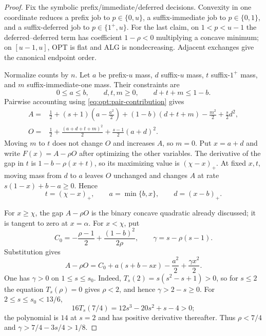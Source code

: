 \begin{proof}
Fix the symbolic prefix/immediate/deferred decisions.  Convexity in one
coordinate reduces a prefix job to $p\in\{0,u\}$, a suffix-immediate job to
$p\in\{0,1\}$, and a suffix-deferred job to $p\in\{1^+,u\}$.  For the last
claim, on $1<p<u-1$ the deferred--deferred term has coefficient
$1-\rho<0$ multiplying a concave minimum; on $[u-1,u]$, OPT is flat and ALG
is nondecreasing.  Adjacent exchanges give the canonical endpoint order.

Normalize counts by $n$.  Let $a$ be prefix-$u$ mass, $d$ suffix-$u$ mass,
$t$ suffix-$1^+$ mass, and $m$ suffix-immediate-one mass.  Their constraints
are
\begin{equation}
 0\le a\le b,
 \qquad d,t,m\ge0,
 \qquad d+t+m\le1-b.
\end{equation}
Pairwise accounting using \cref{eq:opt:pair-contribution} gives
\begin{align}
 A={}&\frac12+(s+1)\left(a-\frac{a^2}{2}\right)
 +(1-b)(d+t+m)-\frac{m^2}{2}+\frac{s}{2}d^2,
 \label{eq:opt:ute-A}\\
 O={}&\frac12+\frac{(a+d+t+m)^2}{2}
 +\frac{s-1}{2}(a+d)^2.
 \label{eq:opt:ute-O}
\end{align}
Moving $m$ to $t$ does not change $O$ and increases $A$, so $m=0$.  Put
$x=a+d$ and write $F(x)=A-\rho O$ after optimizing the other variables.
The derivative of the gap in $t$ is
$1-b-\rho(x+t)$, so its maximizing value is $(\chi-x)_+$.  At fixed
$x,t$, moving mass from $d$ to $a$ leaves $O$ unchanged and changes $A$ at
rate $s(1-x)+b-a\ge0$.  Hence
\begin{equation}
 t=(\chi-x)_+,
 \qquad
 a=\min\{b,x\},
 \qquad d=(x-b)_+.
 \label{eq:opt:ute-reduction}
\end{equation}

For $x\ge\chi$, the gap $A-\rho O$ is the binary concave quadratic already
discussed; it is tangent to zero at $x=\alpha$.  For $x<\chi$, put
\begin{equation}
 C_0=-\frac{\rho-1}{2}+\frac{(1-b)^2}{2\rho},
 \qquad
 \gamma=s-\rho(s-1).
\end{equation}
Substitution gives
\begin{equation}
 A-\rho O
 =C_0+a(s+b-sx)-\frac{a^2}{2}+\frac{\gamma x^2}{2}.
 \label{eq:opt:ute-positive-t}
\end{equation}
One has $\gamma>0$ on $1\le s\le s_0$.  Indeed,
$T_s(2)=s(s^2-s+1)>0$, so for $s\le2$ the equation $T_s(\rho)=0$ gives
$\rho<2$, and hence $\gamma>2-s\ge0$.  For
$2\le s\le s_0<13/6$,
\begin{equation}
 16T_s(7/4)=12s^3-20s^2+s-4>0;
\end{equation}
the polynomial is $14$ at $s=2$ and has positive derivative thereafter.
Thus $\rho<7/4$ and $\gamma>7/4-3s/4>1/8$.


\end{proof}
